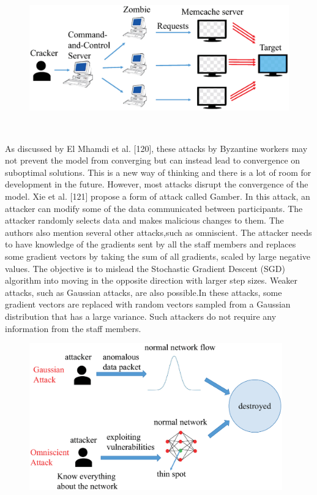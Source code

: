 \begin{figure}[h]
    \centering
    \includegraphics[width=1.0\linewidth,height=2.5in]{output/fig15.eps}
     \caption{}
     \label{fig15}
\end{figure}

As discussed by El Mhamdi et al. [120], these attacks by
Byzantine workers may not prevent the model from
converging but can instead lead to convergence on suboptimal
solutions. This is a new way of thinking and there is a lot of
room for development in the future. However, most attacks
disrupt the convergence of the model. Xie et al. [121]
propose a form of attack called Gamber. In this attack,
an attacker can modify some of the data communicated
between participants. The attacker randomly selects data
and makes malicious changes to them. The authors also
mention several other attacks,such as omniscient. The
attacker needs to have knowledge of the gradients sent by
all the staff members and replaces some gradient vectors
by taking the sum of all gradients, scaled by large negative
values. The objective is to mislead the Stochastic Gradient
Descent (SGD) algorithm into moving in the opposite
direction with larger step sizes. Weaker attacks, such as
Gaussian attacks, are also possible.In these attacks, some
gradient vectors are replaced with random vectors sampled
from a Gaussian distribution that has a large variance.
Such attackers do not require any information from the
staff members.  

\begin{figure}[h]
    \centering
    \includegraphics[width=1.0\linewidth,height=2.5in]{output/fig16.eps}
     \caption{}
     \label{fig16}
\end{figure}


